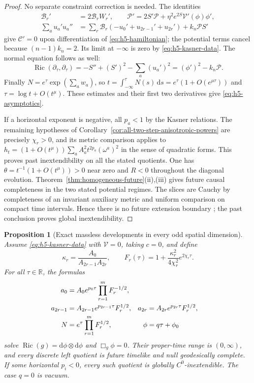 \documentclass[10pt,a4paper]{article}
\numberwithin{equation}{section}
\newtheorem{proposition}[theorem]{Proposition}
\theoremstyle{definition}
\theoremstyle{remark}
\newcommand{\R}{\mathbb R}
\newcommand{\dd}{\mathrm d}
\newcommand{\Ric}{\operatorname{Ric}}
\begin{document}
\begin{proof}
No separate constraint correction is needed.  The identities
\begin{align*}
 \mathcal B_r'&=2\mathcal B_rW_r',\qquad
 \mathcal P'=2S'\mathcal P+
          \eta^2e^{2S}\mathcal V'(\phi)\phi',\\
 \sum_a u_a'u_a''&=
   \sum_r\mathcal B_r(-u_0'+u_{2r-1}'+u_{2r}')
                         +k_n\mathcal P S'
\end{align*}
give $\mathcal C'=0$ upon differentiation of
\eqref{eq:h5-hamiltonian}; the potential terms cancel because
$(n-1)k_n=2$.  Its limit at $-\infty$ is zero by
\eqref{eq:h5-kasner-data}.  The normal equation follows as well:
\[
 \Ric(\partial_\tau,\partial_\tau)
 =-S''+(S')^2-\sum_a(u_a')^2
 = (\phi')^2-k_n\mathcal P.
\]
Finally $N=e^\tau\exp(\sum_a w_a)$, so
$t=\int_{-\infty}^\tau N(s)\,\dd s
=e^\tau(1+O(e^{\mu\tau}))$ and
$\tau=\log t+O(t^\mu)$.  These estimates and their first two
derivatives give \eqref{eq:h5-asymptotics}.

If a horizontal exponent is negative, all $p_a<1$ by the Kasner
relations.  The remaining hypotheses of
Corollary~\ref{cor:all-two-step-anisotropic-powers} are precisely
$\chi_r>0$, and its metric comparison applies to
$h_t=(1+O(t^\mu))\sum_a A_a^2t^{2p_a}(\omega^a)^2$ in the sense
of quadratic forms.  This proves past inextendibility on all the stated
quotients.  One has $\theta=t^{-1}(1+O(t^\mu))>0$ near zero
and $R<0$ throughout the diagonal evolution.
Theorem~\ref{thm:homogeneous-future}\textup{(ii),(iii)} gives future
causal completeness in the two stated potential regimes.  The slices are Cauchy by completeness
of an invariant auxiliary metric and uniform comparison on compact
time intervals.  Hence there is no future extension boundary
\cite{GLS2018}; the past conclusion proves global inextendibility.
\end{proof}

\begin{proposition}[Exact massless developments in every odd spatial dimension]
\label{prop:h5-exact-massless}
Assume \eqref{eq:h5-kasner-data} with $\mathcal V=0$, taking $c=0$,
and define
\[
 \kappa_r=\frac{A_0}{A_{2r-1}A_{2r}},\qquad
 F_r(\tau)=1+\frac{\kappa_r^2}{4\chi_r^2}e^{2\chi_r\tau}.
\]
For all $\tau\in\R$, the formulas
\begin{align}
 a_0&=A_0e^{p_0\tau}\prod_{r=1}^mF_r^{-1/2},\notag\\
 a_{2r-1}&=A_{2r-1}e^{p_{2r-1}\tau}F_r^{1/2},
 &a_{2r}&=A_{2r}e^{p_{2r}\tau}F_r^{1/2},\notag\\
 N&=e^\tau\prod_{r=1}^mF_r^{1/2},
 &\phi&=q\tau+\phi_0
 \label{eq:h5-exact-family}
\end{align}
solve $\Ric(g)=\dd\phi\otimes\dd\phi$ and $\Box_g\phi=0$.
Their proper-time range is $(0,\infty)$, and every discrete left
quotient is future timelike and null geodesically complete.
If some horizontal $p_i<0$, every such quotient is globally
$C^0$-inextendible.  The case $q=0$ is vacuum.
\end{proposition}
\end{document}
